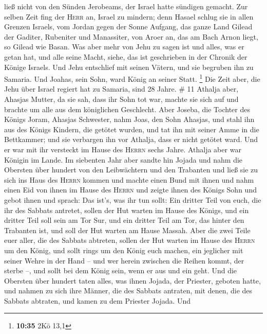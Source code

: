 ließ nicht von den Sünden Jerobeams, der Israel hatte sündigen gemacht.
 Zur selben Zeit fing der \textsc{Herr} an, Israel zu
mindern; denn Hasael schlug sie in allen Grenzen Israels,
 vom Jordan gegen der Sonne Aufgang, das ganze Land
Gilead der Gaditer, Rubeniter und Manassiter, von Aroer an, das am Bach
Arnon liegt, so Gilead wie Basan.  Was aber mehr von Jehu
zu sagen ist und alles, was er getan hat, und alle seine Macht, siehe,
das ist geschrieben in der Chronik der Könige Israels. 
Und Jehu entschlief mit seinen Vätern, und sie begruben ihn zu Samaria.
Und Joahas, sein Sohn, ward König an seiner Statt. \footnote{\textbf{10:35}
  2Kö 13,1}  Die Zeit aber, die Jehu über Israel regiert
hat zu Samaria, sind 28 Jahre. \# 11  Athalja aber,
Ahasjas Mutter, da sie sah, dass ihr Sohn tot war, machte sie sich auf
und brachte um alle aus dem königlichen Geschlecht.  Aber
Joseba, die Tochter des Königs Joram, Ahasjas Schwester, nahm Joas, den
Sohn Ahasjas, und stahl ihn aus des Königs Kindern, die getötet wurden,
und tat ihn mit seiner Amme in die Bettkammer; und sie verbargen ihn vor
Athalja, dass er nicht getötet ward.  Und er war mit ihr
versteckt im Hause des \textsc{Herrn} sechs Jahre. Athalja aber war
Königin im Lande.  Im siebenten Jahr aber sandte hin
Jojada und nahm die Obersten über hundert von den Leibwächtern und den
Trabanten und ließ sie zu sich ins Haus des \textsc{Herrn} kommen und
machte einen Bund mit ihnen und nahm einen Eid von ihnen im Hause des
\textsc{Herrn} und zeigte ihnen des Königs Sohn  und gebot
ihnen und sprach: Das ist's, was ihr tun sollt: Ein dritter Teil von
euch, die ihr des Sabbats antretet, sollen der Hut warten im Hause des
Königs,  und ein dritter Teil soll sein am Tor Sur, und
ein dritter Teil am Tor, das hinter den Trabanten ist, und soll der Hut
warten am Hause Massah.  Aber die zwei Teile euer aller,
die des Sabbats abtreten, sollen der Hut warten im Hause des
\textsc{Herrn} um den König,  und sollt rings um den König
euch machen, ein jeglicher mit seiner Wehre in der Hand -- und wer
herein zwischen die Reihen kommt, der sterbe --, und sollt bei dem König
sein, wenn er aus und ein geht.  Und die Obersten über
hundert taten alles, was ihnen Jojada, der Priester, geboten hatte, und
nahmen zu sich ihre Männer, die des Sabbats antraten, mit denen, die des
Sabbats abtraten, und kamen zu dem Priester Jojada.  Und
